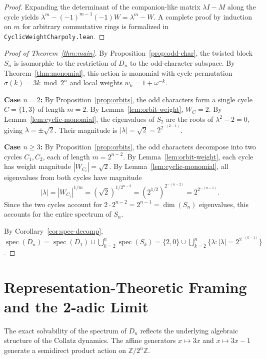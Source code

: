 \documentclass[11pt,reqno]{amsart}
\theoremstyle{definition}
\begin{document}
\begin{proof}
Expanding the determinant of the companion-like matrix $\lambda I - M$ along the cycle yields $\lambda^m - (-1)^{m-1}(-1) W = \lambda^m - W$. A complete proof by induction on $m$ for arbitrary commutative rings is formalized in \texttt{CyclicWeightCharpoly.lean}.
\end{proof}

\begin{proof}[Proof of Theorem~\ref{thm:main}]
By Proposition~\ref{prop:odd-char}, the twisted block $S_n$ is isomorphic to the restriction of $D_n$ to the odd-character subspace. By Theorem~\ref{thm:monomial}, this action is monomial with cycle permutation $\sigma(k) = 3k \bmod 2^n$ and local weights $w_k = 1 + \omega^{-k}$.

\textbf{Case $n = 2$:} By Proposition~\ref{prop:orbits}, the odd characters form a single cycle $C = \{1, 3\}$ of length $m = 2$. By Lemma~\ref{lem:orbit-weight}, $W_C = 2$. By Lemma~\ref{lem:cyclic-monomial}, the eigenvalues of $S_2$ are the roots of $\lambda^2 - 2 = 0$, giving $\lambda = \pm\sqrt{2}$. Their magnitude is $|\lambda| = \sqrt{2} = 2^{2^{-(2-1)}}$.

\textbf{Case $n \ge 3$:} By Proposition~\ref{prop:orbits}, the odd characters decompose into two cycles $C_1, C_2$, each of length $m = 2^{n-2}$. By Lemma~\ref{lem:orbit-weight}, each cycle has weight magnitude $|W_{C_i}| = \sqrt{2}$. By Lemma~\ref{lem:cyclic-monomial}, all eigenvalues from both cycles have magnitude
\[
|\lambda| = |W_{C_i}|^{1/m} = (\sqrt{2})^{1/2^{n-2}} = (2^{1/2})^{2^{-(n-2)}} = 2^{2^{-(n-1)}}.
\]
Since the two cycles account for $2 \cdot 2^{n-2} = 2^{n-1} = \dim(S_n)$ eigenvalues, this accounts for the entire spectrum of $S_n$.

By Corollary~\ref{cor:spec-decomp}, $\operatorname{spec}(D_n) = \operatorname{spec}(D_1) \cup \bigcup_{k=2}^n \operatorname{spec}(S_k) = \{2, 0\} \cup \bigcup_{k=2}^n \{ \lambda : |\lambda| = 2^{2^{-(k-1)}} \}$.
\end{proof}

\section{Representation-Theoretic Framing and the 2-adic Limit}

The exact solvability of the spectrum of $D_n$ reflects the underlying algebraic structure of the Collatz dynamics. The affine generators $x \mapsto 3x$ and $x \mapsto 3x-1$ generate a semidirect product action on $\mathbb{Z}/2^n\mathbb{Z}$.
\end{document}
